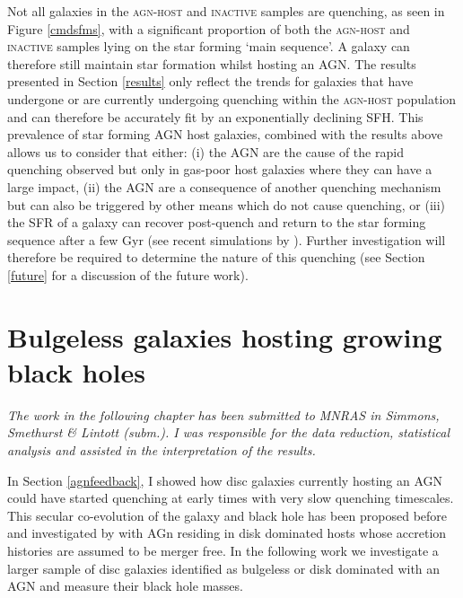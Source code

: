 Not all galaxies in the \textsc{agn-host} and \textsc{inactive} samples are quenching, as seen in Figure \ref{cmdsfms}, with a significant proportion of both the \textsc{agn-host} and \textsc{inactive} samples lying on the star forming `main sequence'. A galaxy can therefore still maintain star formation whilst hosting an AGN. The results presented in Section \ref{results} only reflect the trends for galaxies that have undergone or are currently undergoing quenching within the \textsc{agn-host} population and can therefore be accurately fit by an exponentially declining SFH. This prevalence of star forming AGN host galaxies, combined with the results above allows us to consider that either: (i)  the AGN are the cause of the rapid quenching observed but only in gas-poor host galaxies where they can have a large impact, (ii) the AGN are a consequence of another quenching mechanism but can also be triggered by other means which do not cause quenching, or (iii) the SFR of a galaxy can recover post-quench and return to the star forming sequence after a few Gyr (see recent simulations by \citealt{pontzen16}). Further investigation will therefore be required to determine the nature of this quenching (see Section \ref{future} for a discussion of the future work).
 

\newpage

\section{Bulgeless galaxies hosting growing black holes}\label{intbulgeless}

\emph{The work in the following chapter has been submitted to MNRAS in Simmons, Smethurst \& Lintott (subm.). I was responsible for the data reduction, statistical analysis and assisted in the interpretation of the results.}

In Section \ref{agnfeedback}, I showed how disc galaxies currently hosting an AGN could have started quenching at early times with very slow quenching timescales. This secular co-evolution of the galaxy and black hole has been proposed before and investigated by \citet{Simmons13} with AGn residing in disk dominated hosts whose accretion histories are assumed to be merger free. In the following work we investigate a larger sample of disc galaxies identified as bulgeless or disk dominated with an AGN and measure their black hole masses. 

